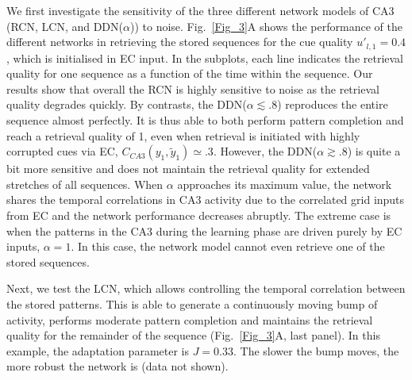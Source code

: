 \documentclass[utf8]{frontiersSCNS} %
\begin{document}
We first investigate the sensitivity of the three different network models of CA3 (RCN, LCN, and DDN($\alpha$)) to noise. Fig.~\ref{Fig_3}A shows the performance of the different networks in retrieving the stored sequences for the cue quality $u'_{l, 1} = 0.4$, which is initialised in EC input. In the subplots, each line indicates the retrieval quality for one sequence as a function of the time within the sequence. Our results show that overall the RCN is highly sensitive to noise as the retrieval quality degrades quickly.  
By contrasts, the DDN($\alpha \lesssim .8$) reproduces the entire sequence almost perfectly. It is thus able to both perform pattern completion and reach a retrieval quality of 1, even when retrieval is initiated with highly corrupted cues via EC, $C_{CA3} (y_1, \tilde{y}_1) \simeq .3 $. 
However, the DDN($\alpha \gtrsim .8$) is quite a bit more sensitive and does not maintain the retrieval quality for extended stretches of all sequences. When $\alpha$ approaches its maximum value, the network shares the temporal correlations in CA3 activity due to the correlated grid inputs from EC and the network performance decreases abruptly. The extreme case is when the patterns in the CA3 during the learning phase are driven purely by EC inputs, $\alpha = 1$. In this case, the network model cannot even retrieve one of the stored sequences.
% 

Next, we test the LCN, which allows controlling the temporal correlation between the stored patterns. This is able to generate a continuously moving bump of activity, performs moderate pattern completion and maintains the retrieval quality for the remainder of the sequence (Fig.~\ref{Fig_3}A, last panel).
In this example, the adaptation parameter is $J = 0.33$. The slower the bump moves, the more robust the network is (data not shown).
 
\end{document}
